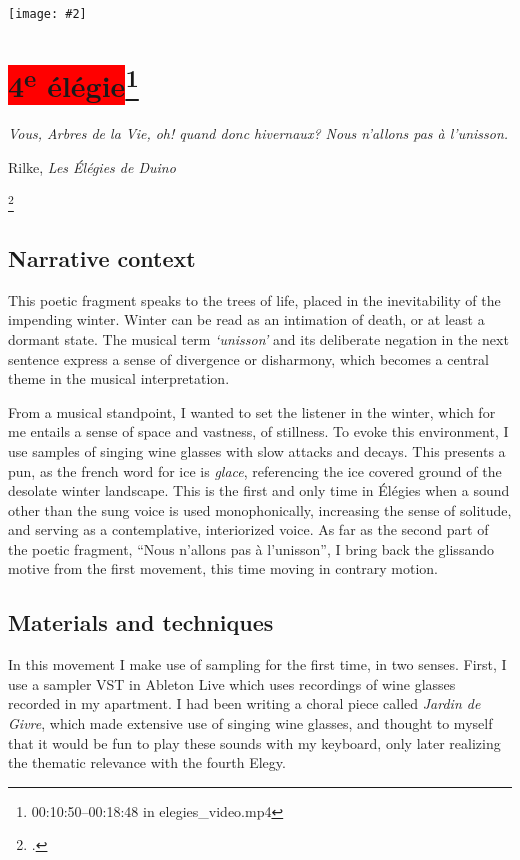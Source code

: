 \documentclass[12pt,twoside,maitrise]{dms_ks}
\newcommand{\customincludeexamples}[4][]{%
    \begin{example}[H]
        \centering
        \texttt{[image: \#2]}
        \caption{#4}
	\label{#3} 
    \end{example}
}
\theoremstyle{definition}
\begin{document}
{\customincludeexamples[width=\textwidth]{3e_4}{ex:3e_4}{The end of the second variation, an improvisational section, and the three synthetic bell tolls that end the movement (m. 26 to p.~5, sys.~2).}

\section{\colorbox{red}{4\textsuperscript{e} élégie}\footnote{00:10:50--00:18:48 in elegies\_video.mp4}}

\epigraph{\textit{Vous, Arbres de la Vie, oh! quand donc hivernaux? Nous n'allons pas à l'unisson.}}{Rilke, \textit{Les Élégies de Duino}\protect\footnotemark}

\footcitetext[39]{rilke_egies_1986}

\subsection{Narrative context}

This poetic fragment speaks to the trees of life, placed in the inevitability of the impending winter.
Winter can be read as an intimation of death, or at least a dormant state.
The musical term \textit{`unisson'} and its deliberate negation in the next sentence express a sense of divergence or disharmony, which becomes a central theme in the musical interpretation.

From a musical standpoint, I wanted to set the listener in the winter, which for me entails a sense of space and vastness, of stillness.
To evoke this environment, I use samples of singing wine glasses with slow attacks and decays.
This presents a pun, as the french word for ice is \textit{glace}, referencing the ice covered ground of the desolate winter landscape.
This is the first and only time in Élégies when a sound other than the sung voice is used monophonically, increasing the sense of solitude, and serving as a contemplative, interiorized voice.
As far as the second part of the poetic fragment, “Nous n'allons pas à l'unisson”, I bring back the glissando motive from the first movement, this time moving in contrary motion.

\subsection{Materials and techniques}

In this movement I make use of sampling for the first time, in two senses.
First, I use a sampler VST in Ableton Live which uses recordings of wine glasses recorded in my apartment.
I had been writing a choral piece called \textit{Jardin de Givre}, which made extensive use of singing wine glasses, and thought to myself that it would be fun to play these sounds with my keyboard, only later realizing the thematic relevance with the fourth Elegy.

}
\end{document}
